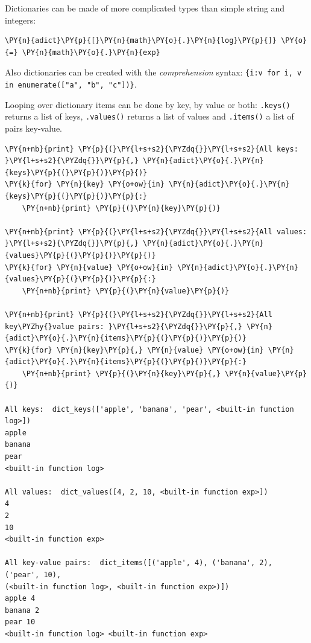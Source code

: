 Dictionaries can be made of more complicated types than simple string and integers:

\begin{codebox}
\begin{Verbatim}[commandchars=\\\{\}]
\PY{n}{adict}\PY{p}{[}\PY{n}{math}\PY{o}{.}\PY{n}{log}\PY{p}{]} \PY{o}{=} \PY{n}{math}\PY{o}{.}\PY{n}{exp}
\end{Verbatim}
\end{codebox}

Also dictionaries can be created with the \emph{comprehension} syntax: 
\texttt{\{i:v for i, v in enumerate(["a", "b", "c"])\}}.

Looping over dictionary items can be done by key, by value or both: \texttt{.keys()} returns a list of keys, \texttt{.values()} returns a list of values and \texttt{.items()} a list of pairs key-value.

\begin{codebox}
\begin{Verbatim}[commandchars=\\\{\}]
\PY{n+nb}{print} \PY{p}{(}\PY{l+s+s2}{\PYZdq{}}\PY{l+s+s2}{All keys: }\PY{l+s+s2}{\PYZdq{}}\PY{p}{,} \PY{n}{adict}\PY{o}{.}\PY{n}{keys}\PY{p}{(}\PY{p}{)}\PY{p}{)}
\PY{k}{for} \PY{n}{key} \PY{o+ow}{in} \PY{n}{adict}\PY{o}{.}\PY{n}{keys}\PY{p}{(}\PY{p}{)}\PY{p}{:}
    \PY{n+nb}{print} \PY{p}{(}\PY{n}{key}\PY{p}{)}

\PY{n+nb}{print} \PY{p}{(}\PY{l+s+s2}{\PYZdq{}}\PY{l+s+s2}{All values: }\PY{l+s+s2}{\PYZdq{}}\PY{p}{,} \PY{n}{adict}\PY{o}{.}\PY{n}{values}\PY{p}{(}\PY{p}{)}\PY{p}{)}
\PY{k}{for} \PY{n}{value} \PY{o+ow}{in} \PY{n}{adict}\PY{o}{.}\PY{n}{values}\PY{p}{(}\PY{p}{)}\PY{p}{:}
    \PY{n+nb}{print} \PY{p}{(}\PY{n}{value}\PY{p}{)}

\PY{n+nb}{print} \PY{p}{(}\PY{l+s+s2}{\PYZdq{}}\PY{l+s+s2}{All key\PYZhy{}value pairs: }\PY{l+s+s2}{\PYZdq{}}\PY{p}{,} \PY{n}{adict}\PY{o}{.}\PY{n}{items}\PY{p}{(}\PY{p}{)}\PY{p}{)}
\PY{k}{for} \PY{n}{key}\PY{p}{,} \PY{n}{value} \PY{o+ow}{in} \PY{n}{adict}\PY{o}{.}\PY{n}{items}\PY{p}{(}\PY{p}{)}\PY{p}{:}
    \PY{n+nb}{print} \PY{p}{(}\PY{n}{key}\PY{p}{,} \PY{n}{value}\PY{p}{)}

All keys:  dict_keys(['apple', 'banana', 'pear', <built-in function log>])
apple
banana
pear
<built-in function log>

All values:  dict_values([4, 2, 10, <built-in function exp>])
4
2
10
<built-in function exp>

All key-value pairs:  dict_items([('apple', 4), ('banana', 2), ('pear', 10),
(<built-in function log>, <built-in function exp>)])
apple 4
banana 2
pear 10
<built-in function log> <built-in function exp>
\end{Verbatim}
\end{codebox}


